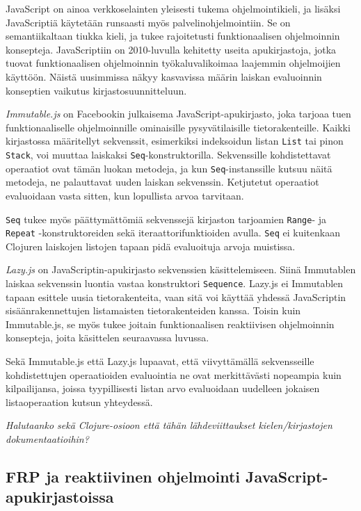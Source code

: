 JavaScript on ainoa verkkoselainten yleisesti tukema ohjelmointikieli, ja lisäksi JavaScriptiä käytetään runsaasti myös palvelinohjelmointiin. Se on semantiikaltaan tiukka kieli, ja tukee rajoitetusti funktionaalisen ohjelmoinnin konsepteja.  JavaScriptiin on 2010-luvulla kehitetty useita apukirjastoja, jotka tuovat funktionaalisen ohjelmoinnin työkaluvalikoimaa laajemmin ohjelmoijien käyttöön. Näistä uusimmissa näkyy kasvavissa määrin laiskan evaluoinnin konseptien vaikutus kirjastosuunnitteluun.

\textit{Immutable.js} on Facebookin julkaisema JavaScript-apukirjasto, joka tarjoaa tuen funktionaaliselle ohjelmoinnille ominaisille pysyvätilaisille tietorakenteille. Kaikki kirjastossa määritellyt sekvenssit, esimerkiksi indeksoidun listan \verb!List! tai pinon \verb!Stack!, voi muuttaa laiskaksi \verb!Seq!-konstruktorilla. Sekvenssille kohdistettavat operaatiot ovat tämän luokan metodeja, ja kun \verb!Seq!-instanssille kutsuu näitä metodeja, ne palauttavat uuden laiskan sekvenssin. Ketjutetut operaatiot evaluoidaan vasta sitten, kun lopullista arvoa tarvitaan.

\begin{sloppypar}
\verb!Seq! tukee myös päättymättömiä sekvenssejä kirjaston tarjoamien \verb!Range!- ja \verb!Repeat! \mbox{-konstruktoreiden} sekä iteraattorifunktioiden avulla. \verb!Seq! ei kuitenkaan Clojuren laiskojen listojen tapaan pidä evaluoituja arvoja muistissa.
\end{sloppypar}

\textit{Lazy.js} on JavaScriptin-apukirjasto sekvenssien käsittelemiseen. Siinä Immutablen laiskaa sekvenssin luontia vastaa konstruktori \verb!Sequence!. Lazy.js ei Immutablen tapaan esittele uusia tietorakenteita, vaan sitä voi käyttää yhdessä JavaScriptin sisäänrakennettujen listamaisten tietorakenteiden kanssa. Toisin kuin Immutable.js, se myös tukee joitain funktionaalisen reaktiivisen ohjelmoinnin konsepteja, joita käsittelen seuraavassa luvussa.

Sekä Immutable.js että Lazy.js lupaavat, että viivyttämällä sekvensseille kohdistettujen operaatioiden evaluointia ne ovat merkittävästi nopeampia kuin kilpailijansa, joissa tyypillisesti listan arvo evaluoidaan uudelleen jokaisen listaoperaation kutsun yhteydessä.

\textit{Halutaanko sekä Clojure-osioon että tähän lähdeviittaukset kielen/kirjastojen dokumentaatioihin?}

\subsection{FRP ja reaktiivinen ohjelmointi JavaScript-apukirjastoissa}

